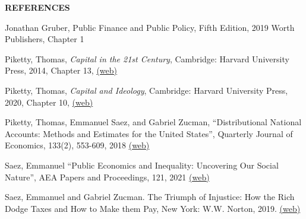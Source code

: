 \documentclass[landscape]{slides}
\begin{document}
\begin{slide}
\begin{center}
{\bf REFERENCES}
\end{center}
{\small

Jonathan Gruber, Public Finance and Public Policy, Fifth Edition, 2019 Worth Publishers, Chapter 1



Piketty, Thomas, \emph{Capital in the 21st Century},  Cambridge: Harvard University Press, 2014, Chapter 13,  
\href{http://piketty.pse.ens.fr/en/capital21c2}{(web)}

Piketty, Thomas, \emph{Capital and Ideology},  Cambridge: Harvard University Press, 2020,  Chapter 10,
\href{http://piketty.pse.ens.fr/en/ideology}{(web)}


Piketty, Thomas, Emmanuel Saez, and Gabriel Zucman,  ``Distributional National Accounts:
Methods and Estimates for the United States'', Quarterly Journal of Economics, 133(2), 553-609, 2018
\href{https://eml.berkeley.edu/~saez/PSZ2018QJE.pdf} {(web)}

Saez, Emmanuel  ``Public Economics and Inequality: Uncovering Our Social Nature'', AEA Papers and Proceedings, 121, 2021
\href{https://eml.berkeley.edu/~saez/saez-AEAlecture.pdf} {(web)}

Saez, Emmanuel and Gabriel Zucman. The Triumph of Injustice: How the Rich Dodge Taxes and How to Make them Pay, New York: W.W. Norton, 2019. 
\href{http://www.taxjusticenow.org} {(web)}


}
\end{slide}
\end{document}
